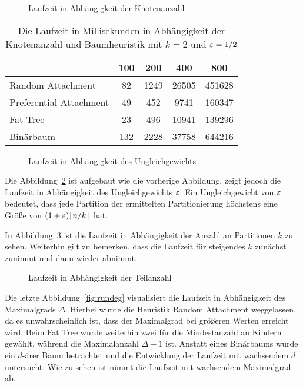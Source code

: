 \begin{figure}
    \centering
    
    \caption{Laufzeit in Abhängigkeit der Knotenanzahl\label{fig:runnodes}}
\end{figure}

\begin{table}
    \centering
    \begin{tabular}{l*{4}{c}}
        \toprule
        & 100 & 200 & 400 & 800 \\
        \midrule
        Random Attachment & 82 & 1249 & 26505 & 451628 \\ 
        Preferential Attachment & 49 & 452 & 9741 & 160347 \\
        Fat Tree & 23 & 496 & 10941 & 139296 \\ 
        Binärbaum & 132 & 2228 & 37758 & 644216 \\ 
        \bottomrule
    \end{tabular}
    \caption{Die Laufzeit in Millisekunden in Abhängigkeit der Knotenanzahl und Baumheuristik mit $k=2$ und $\varepsilon=1/2$\label{tab:highnodecnt}}
\end{table}

\begin{figure}
    \centering
    
    \caption{Laufzeit in Abhängigkeit des Ungleichgewichts\label{fig:runimb}}
\end{figure}

Die Abbildung~\ref{fig:runimb} ist aufgebaut wie die vorherige Abbildung, zeigt jedoch die Laufzeit in Abhängigkeit des Ungleichgewichts $\varepsilon$.
Ein Ungleichgewicht von $\varepsilon$ bedeutet, dass jede Partition der ermittelten Partitionierung höchstens eine Größe von $(1 + \varepsilon) \lceil n/k\rceil$ hat.

In Abbildung~\ref{fig:runkparts} ist die Laufzeit in Abhängigkeit der Anzahl an Partitionen $k$ zu sehen.
Weiterhin gilt zu bemerken, dass die Laufzeit für steigendes $k$ zunächst zunimmt und dann wieder abnimmt.

\begin{figure}
    \centering
    
    \caption{Laufzeit in Abhängigkeit der Teilanzahl\label{fig:runkparts}}
\end{figure}

Die letzte Abbildung~\ref{fig:rundeg} visualisiert die Laufzeit in Abhängigkeit des Maximalgrads $\Delta$.
Hierbei wurde die Heuristik Random Attachment weggelassen, da es unwahrscheinlich ist, dass der Maximalgrad bei größeren Werten erreicht wird.
Beim Fat Tree wurde weiterhin zwei für die Mindestanzahl an Kindern gewählt, während die Maximalanzahl $\Delta - 1$ ist.
Anstatt eines Binärbaums wurde ein $d$\hyp ärer Baum betrachtet und die Entwicklung der Laufzeit mit wachsendem $d$ untersucht.
Wie zu sehen ist nimmt die Laufzeit mit wachsendem Maximalgrad ab.

